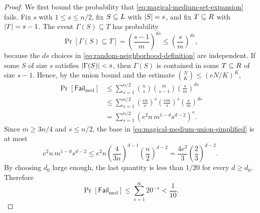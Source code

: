 \begin{proof}
	We first bound the probability that \cref{eq:magical-medium-set-expansion} fails. Fix \(s\) with \(1\leq s\leq n/2\), fix \(S\subseteq L\) with \(\lvert S\rvert=s\), and fix \(T\subseteq R\) with \(\lvert T\rvert=s-1\). The event \(\Gamma(S)\subseteq T\) has probability
	\begin{equation}
		\label{eq:magical-medium-fixed-probability}
		\Pr[\Gamma(S)\subseteq T]=\left(\frac{s-1}{m}\right)^{ds}\leq \left(\frac{s}{m}\right)^{ds},
	\end{equation}
	because the \(ds\) choices in \cref{eq:random-neighborhood-definition} are independent. If some \(S\) of size \(s\) satisfies \(\lvert\Gamma(S)\rvert<s\), then \(\Gamma(S)\) is contained in some \(T\subseteq R\) of size \(s-1\). Hence, by the union bound and the estimate \(\binom{N}{K}\leq (eN/K)^K\),
	\begin{align}
		\Pr[\mathsf{Fail}_{\mathrm{med}}]
		 & \leq \sum_{s=1}^{n/2}\binom{n}{s}\binom{m}{s-1}\left(\frac{s}{m}\right)^{ds} \label{eq:magical-medium-union-raw}                                  \\
		 & \leq \sum_{s=1}^{n/2}\left(\frac{en}{s}\right)^s\left(\frac{em}{s}\right)^s\left(\frac{s}{m}\right)^{ds} \label{eq:magical-medium-union-binomial} \\
		 & =\sum_{s=1}^{n/2}\left(e^2 n\,m^{1-d}s^{d-2}\right)^s . \label{eq:magical-medium-union-simplified}
	\end{align}
	Since \(m\geq 3n/4\) and \(s\leq n/2\), the base in \cref{eq:magical-medium-union-simplified} is at most
	\begin{equation}
		\label{eq:magical-medium-base-bound}
		e^2 n\,m^{1-d}s^{d-2}
		\leq e^2 n\left(\frac{4}{3n}\right)^{d-1}\left(\frac{n}{2}\right)^{d-2}
		=\frac{4e^2}{3}\left(\frac{2}{3}\right)^{d-2}.
	\end{equation}
	By choosing \(d_0\) large enough, the last quantity is less than \(1/20\) for every \(d\geq d_0\). Therefore
	\begin{equation}
		\label{eq:magical-medium-failure-bound}
		\Pr[\mathsf{Fail}_{\mathrm{med}}]
		\leq \sum_{s=1}^{\infty}20^{-s}<\frac{1}{10}.
	\end{equation}


\end{proof}
